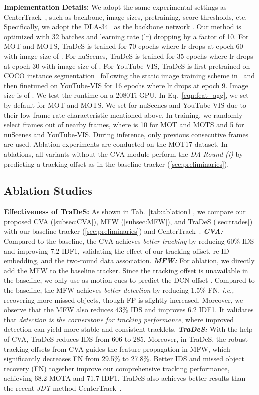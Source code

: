 \documentclass[final]{cvpr}
\newcommand{\myparagraph}[1]{{\vspace{0.5em} \noindent \bf #1}}
\begin{document}
\vspace{-1mm}
\myparagraph{Implementation Details:} We adopt the same experimental settings as CenterTrack~\cite{CenterTrack}, such as backbone, image sizes, pretraining, score thresholds, etc. Specifically, we adopt the DLA-34~\cite{yu2018deep} as the backbone network . Our method is optimized with 32 batches and learning rate (lr)  dropping by a factor of 10. For MOT and MOTS, TraDeS is trained for 70 epochs where lr drops at epoch 60 with image size of . For nuScenes, TraDeS is trained for 35 epochs where lr drops at epoch 30 with image size of . For YouTube-VIS, TraDeS is first pretrained on COCO instance segmentation~\cite{lin2014microsoft} following the static image training scheme in~\cite{CenterTrack} and then finetuned on YouTube-VIS for 16 epochs where lr drops at epoch 9. Image size is of . We test the runtime on a 2080Ti GPU. In Eq.~\ref{eqn:feat_agg}, we set  by default for MOT and MOTS. We set  for nuScenes and YouTube-VIS due to their low frame rate characteristic mentioned above. In training, we randomly select  frames out of nearby  frames, where  is 10 for MOT and MOTS and 5 for nuScenes and YouTube-VIS. During inference, only previous  consecutive frames are used. Ablation experiments are conducted on the MOT17 dataset. In ablations, all variants without the CVA module perform the \emph{DA-Round (i)} by predicting a tracking offset  as in the baseline tracker (\cref{sec:preliminaries}).

\subsection{Ablation Studies}
\vspace{-2mm}
\label{subsec:ablation_studies}
\myparagraph{Effectiveness of TraDeS:} As shown in Tab.~\ref{tab:ablation1}, we compare our proposed CVA (\cref{subsec:CVA}), MFW (\cref{subsec:MFW}), and TraDeS (\cref{sec:trades}) with our baseline tracker (\cref{sec:preliminaries}) and CenterTrack~\cite{CenterTrack}. \textbf{\emph{CVA:}} Compared to the baseline, the CVA achieves \emph{better tracking} by reducing 60\% IDS and improving 7.2 IDF1, validating the effect of our tracking offset, re-ID embedding, and the two-round data association. \textbf{\emph{MFW:}} For ablation, we directly add the MFW to the baseline tracker. Since the tracking offset  is unavailable in the baseline, we only use  as motion cues to predict the DCN offset . Compared to the baseline, the MFW achieves \emph{better detection} by reducing 1.5\% FN, \emph{i.e.,} recovering more missed objects, though FP is slightly increased. Moreover, we observe that the MFW also reduces 43\% IDS and improves 6.2 IDF1. It validates that \emph{detection is the cornerstone for tracking performance}, where improved detection can yield more stable and consistent tracklets. \textbf{\emph{TraDeS:}} With the help of CVA, TraDeS reduces IDS from 606 to 285. Moreover, in TraDeS, the robust tracking offsets  from CVA guides the feature propagation in MFW, which significantly decreases FN from 29.5\% to 27.8\%. Better IDS and missed object recovery (FN) together improve our comprehensive tracking performance, achieving 68.2 MOTA and 71.7 IDF1. TraDeS also achieves better results than the recent \emph{JDT} method CenterTrack~\cite{CenterTrack}.
\end{document}
